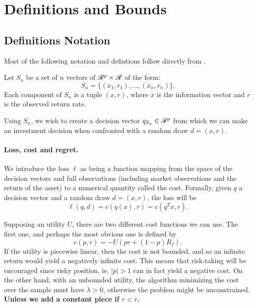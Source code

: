\section{Definitions and Bounds}

\subsection{Definitions Notation}

Most of the following notation and defintions follow directly from \cite{bousquet2002}.

Let $S_n$ be a set of $n$ vectors of $\mathscr{R}^p\times\mathscr{R}$ of the form:
\begin{equation}
  S_n = \{(x_1,r_1),\ldots,(x_n,r_n)\}.
\end{equation}
Each component of $S_n$ is a tuple $(x,r)$, where $x$ is the information vector and $r$ is
the observed return rate.

Using $S_n$, we wish to create a decision vector $q_{S_n}\in\mathscr{R}^p$ from which we can
make an investment decision when confronted with a random draw $d=(x,r)$.

\paragraph{Loss, cost and regret.}
We introduce the loss $\ell$ as being a function mapping from the space of the decision
vectors and full observations (including market observations and the return of the asset)
to a numerical quantity called the cost. Formally, given $q$ a decision vector and a
random draw $d=(x,r)$, the loss will be
\begin{equation}
\ell(q,d) = c(q(x),r) = c(q^Tx,r).
\end{equation}

Supposing an utility $U$, there are two different cost functions we can use. The first
one, and perhaps the most obvious one is defined by
\begin{equation}
  c(p,r) = -U(pr + (1-p)R_f).
\end{equation}
If the utility is piecewise linear, then the cost is not bounded, and so an infinite
return would yield a negatively infinite cost. This means that risk-taking will be
encouraged since risky position, ie. $|p|>1$ can in fact yield a negative cost. On the
other hand, with an unbounded utility, the algorithm minimizing the cost over the sample
must have $\lambda > 0$, otherwise the problem might be unconstrained. \textbf{Unless we
  add a constant piece if $r<\bar r$.}

